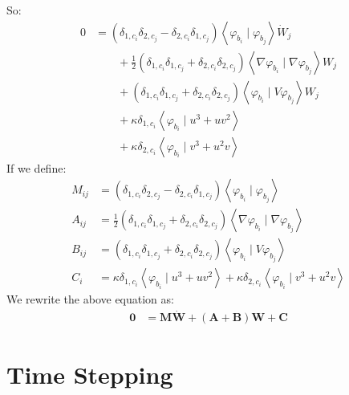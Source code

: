 \documentclass{article}
\newcommand{\bvec}[1]{\boldsymbol{#1}}
\newcommand{\brvec}[1]{\mathbf{#1}}
\newcommand{\bmat}[1]{\boldsymbol{#1}}
\begin{document}
So:
\begin{align*}
    0 & = (\delta_{1, c_i} \delta_{2, c_j} - \delta_{2, c_i} \delta_{1, c_j})
            \left< \varphi_{b_i} \mid \varphi_{b_j} \right> \dot{W}_j \\
        & \qquad + \frac{1}{2} (\delta_{1, c_i} \delta_{1, c_j} + \delta_{2, c_i} \delta_{2, c_j})
            \left< \nabla \varphi_{b_i} \mid \nabla \varphi_{b_j} \right> W_j \\
        & \qquad + (\delta_{1, c_i} \delta_{1, c_j} + \delta_{2, c_i} \delta_{2, c_j})
            \left< \varphi_{b_i} \mid V \varphi_{b_j} \right> W_j \\
        & \qquad + \kappa \delta_{1, c_i} \left< \varphi_{b_i} \mid u^3 + u v^2 \right> \\
        & \qquad + \kappa \delta_{2, c_i} \left< \varphi_{b_i} \mid v^3 + u^2 v \right>
\end{align*}
\noindent If we define:
\begin{align*}
    M_{ij} & = (\delta_{1, c_i} \delta_{2, c_j} - \delta_{2, c_i} \delta_{1, c_j})
        \left< \varphi_{b_i} \mid \varphi_{b_j} \right> \\
    A_{ij} & = \frac{1}{2} (\delta_{1, c_i} \delta_{1, c_j} + \delta_{2, c_i} \delta_{2, c_j})
        \left< \nabla \varphi_{b_i} \mid \nabla \varphi_{b_j} \right> \\
    B_{ij} & = (\delta_{1, c_i} \delta_{1, c_j} + \delta_{2, c_i} \delta_{2, c_j})
        \left< \varphi_{b_i} \mid V \varphi_{b_j} \right> \\
    C_i & = \kappa \delta_{1, c_i} \left< \varphi_{b_i} \mid u^3 + u v^2 \right>
        + \kappa \delta_{2, c_i} \left< \varphi_{b_i} \mid v^3 + u^2 v \right>
\end{align*}
\noindent We rewrite the above equation as:
\begin{align*}
    \brvec{0}
        & = \bmat{M} \dot{\bvec{W}}
            + (\bmat{A} + \bmat{B}) \bvec{W}
            + \bvec{C}
\end{align*}

\newpage

\section{Time Stepping}
\end{document}
